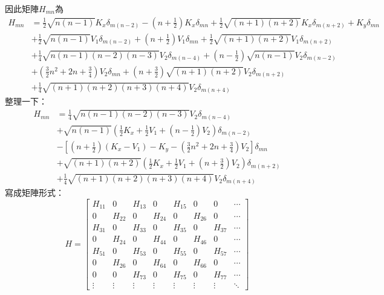\documentclass[12pt]{article}
\begin{document}
因此矩陣$H_{mn}$為
\begin{align}
H_{mn} &= \frac{1}{2}\sqrt{n(n-1)}K_x\delta_{m(n-2)} - \left(n+\frac{1}{2}\right)K_x\delta_{mn} + \frac{1}{2}\sqrt{(n+1)(n+2)}K_x\delta_{m(n+2)} + K_y\delta_{mn} \nonumber \\
&+ \frac{1}{2}\sqrt{n(n-1)}V_1\delta_{m(n-2)} + \left(n+\frac{1}{2}\right)V_1\delta_{mn} + \frac{1}{2}\sqrt{(n+1)(n+2)}V_1\delta_{m(n+2)} \nonumber \\
&+ \frac{1}{4}\sqrt{n(n-1)(n-2)(n-3)}V_2\delta_{m(n-4)} + \left(n-\frac{1}{2}\right)\sqrt{n(n-1)}V_2\delta_{m(n-2)} \nonumber \\
&+ \left(\frac{3}{2}n^2+2n+\frac{3}{4}\right)V_2\delta_{mn} + \left(n+\frac{3}{2}\right)\sqrt{(n+1)(n+2)}V_2\delta_{m(n+2)} \nonumber \\
&+ \frac{1}{4}\sqrt{(n+1)(n+2)(n+3)(n+4)}V_2\delta_{m(n+4)}
\end{align}
整理一下：
\begin{align}
    H_{mn}&= \frac{1}{4}\sqrt{n(n-1)(n-2)(n-3)}V_2\delta_{m(n-4)} \nonumber \\
&+ \sqrt{n(n-1)}\left(\frac{1}{2}K_x + \frac{1}{2}V_1 + \left(n-\frac{1}{2}\right)V_2\right)\delta_{m(n-2)} \nonumber \\
&- \left[\left(n+\frac{1}{2}\right)(K_x-V_1) - K_y - \left(\frac{3}{2}n^2+2n+\frac{3}{4}\right)V_2\right]\delta_{mn} \nonumber \\
&+ \sqrt{(n+1)(n+2)}\left(\frac{1}{2}K_x + \frac{1}{2}V_1 + \left(n+\frac{3}{2}\right)V_2\right)\delta_{m(n+2)} \nonumber \\
&+ \frac{1}{4}\sqrt{(n+1)(n+2)(n+3)(n+4)}V_2\delta_{m(n+4)}
\end{align}
寫成矩陣形式： 
\begin{equation}
    H=
    \begin{bmatrix}
        H_{11} & 0 & H_{13} & 0 & H_{15} & 0 & 0 & \cdots \\
0 & H_{22} & 0 & H_{24} & 0 & H_{26} & 0 & \cdots \\
H_{31} & 0 & H_{33} & 0 & H_{35} & 0 & H_{37} & \cdots \\
0 & H_{24} & 0 & H_{44} & 0 & H_{46} & 0 & \cdots \\
H_{51} & 0 & H_{53} & 0 & H_{55} & 0 & H_{57} & \cdots \\
0 & H_{26} & 0 & H_{64} & 0 & H_{66} & 0 & \cdots \\
0 & 0 & H_{73} & 0 & H_{75} & 0 & H_{77} & \cdots \\
\vdots & \vdots & \vdots & \vdots & \vdots & \vdots & \vdots & \ddots
    \end{bmatrix}
\end{equation}
\end{document}

